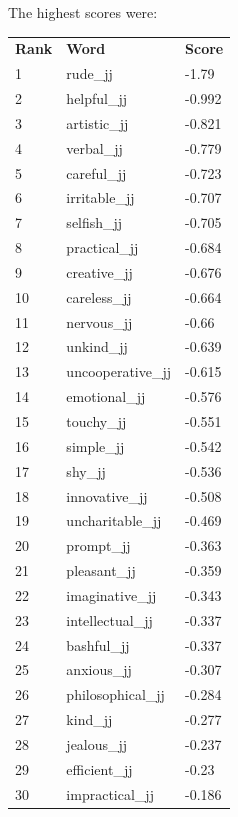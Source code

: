 \documentclass[10pt,letterpaper]{book}
\begin{document}
The highest scores were:
\begin{tabular}{ l l l }
        \textbf{Rank} & \textbf{Word} & \textbf{Score} \\
        1 & rude\_jj & -1.79 \\
        2 & helpful\_jj & -0.992 \\
        3 & artistic\_jj & -0.821 \\
        4 & verbal\_jj & -0.779 \\
        5 & careful\_jj & -0.723 \\
        6 & irritable\_jj & -0.707 \\
        7 & selfish\_jj & -0.705 \\
        8 & practical\_jj & -0.684 \\
        9 & creative\_jj & -0.676 \\
        10 & careless\_jj & -0.664 \\
        11 & nervous\_jj & -0.66 \\
        12 & unkind\_jj & -0.639 \\
        13 & uncooperative\_jj & -0.615 \\
        14 & emotional\_jj & -0.576 \\
        15 & touchy\_jj & -0.551 \\
        16 & simple\_jj & -0.542 \\
        17 & shy\_jj & -0.536 \\
        18 & innovative\_jj & -0.508 \\
        19 & uncharitable\_jj & -0.469 \\
        20 & prompt\_jj & -0.363 \\
        21 & pleasant\_jj & -0.359 \\
        22 & imaginative\_jj & -0.343 \\
        23 & intellectual\_jj & -0.337 \\
        24 & bashful\_jj & -0.337 \\
        25 & anxious\_jj & -0.307 \\
        26 & philosophical\_jj & -0.284 \\
        27 & kind\_jj & -0.277 \\
        28 & jealous\_jj & -0.237 \\
        29 & efficient\_jj & -0.23 \\
        30 & impractical\_jj & -0.186 \\
\end{tabular}
\end{document}

